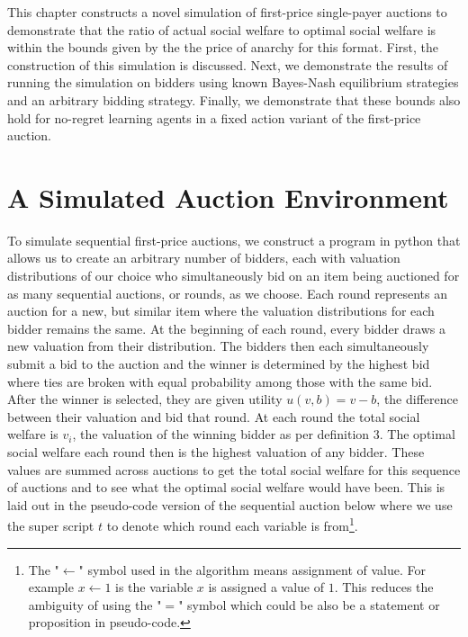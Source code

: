 \documentclass[12pt,twoside]{reedthesis}
\begin{document}
This chapter constructs a novel simulation of first-price single-payer auctions to demonstrate that the ratio of actual social welfare to optimal social welfare is within the bounds given by the the price of anarchy for this format. First, the construction of this simulation is discussed. Next, we demonstrate the results of running the simulation on bidders using known Bayes-Nash equilibrium strategies and an arbitrary bidding strategy. Finally, we demonstrate that these bounds also hold for no-regret learning agents in a fixed action variant of the first-price auction.

\section{A Simulated Auction Environment}

To simulate sequential first-price auctions, we construct a program in python that allows us to create an arbitrary number of bidders, each with valuation distributions of our choice who simultaneously bid on an item being auctioned for as many sequential auctions, or rounds, as we choose. Each round represents an auction for a new, but similar item where the valuation distributions for each bidder remains the same. At the beginning of each round, every bidder draws a new valuation from their distribution. The bidders then each simultaneously submit a bid to the auction and the winner is determined by the highest bid where ties are broken with equal probability among those with the same bid. After the winner is selected, they are given utility $u(v, b) = v - b$, the difference between their valuation and bid that round. At each round the total social welfare is $v_i$, the valuation of the winning bidder as per definition 3. %
The optimal social welfare each round then is the highest valuation of any bidder. These values are summed across auctions to get the total social welfare for this sequence of auctions and to see what the optimal social welfare would have been. This is laid out in the pseudo-code version of the sequential auction below where we use the super script $t$ to denote which round each variable is from\footnote{The "$\leftarrow$" symbol used in the algorithm means assignment of value. For example $x \leftarrow 1$ is the variable $x$ is assigned a value of $1$. This reduces the ambiguity of using the "$=$" symbol which could be also be a statement or proposition in pseudo-code.}.\\
\end{document}
